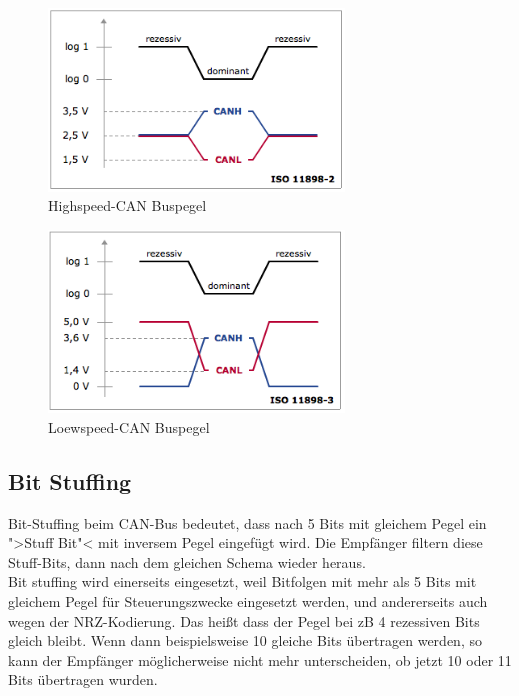 \begin{figure}[h] 
\centering
\includegraphics[width=0.7\textwidth]{figures/highcan}
\caption{Highspeed-CAN Buspegel \citep{VEC}} 
\label{pic:highcan}
\end{figure} 

\begin{figure}[h] 
\centering
\includegraphics[width=0.7\textwidth]{figures/lowcan}
\caption{Loewspeed-CAN Buspegel \citep{VEC}} 
\label{pic:lowcan}
\end{figure}

\clearpage
\newpage
\subsection{Bit Stuffing}
\label{sec:bitstuffing} 
Bit-Stuffing beim CAN-Bus bedeutet, dass
nach 5 Bits mit gleichem Pegel ein ">Stuff Bit"< mit inversem Pegel
eingefügt wird. Die Empfänger filtern diese Stuff-Bits, dann nach dem
gleichen Schema wieder heraus.
\\ Bit stuffing wird einerseits
eingesetzt, weil Bitfolgen mit mehr als 5 Bits mit gleichem Pegel für
Steuerungszwecke eingesetzt werden, und andererseits auch wegen der
NRZ-Kodierung. Das heißt dass der Pegel bei zB 4 rezessiven Bits
gleich bleibt. Wenn dann beispielsweise 10 gleiche Bits übertragen
werden, so kann der Empfänger möglicherweise nicht mehr unterscheiden,
ob jetzt 10 oder 11 Bits übertragen wurden.
	
